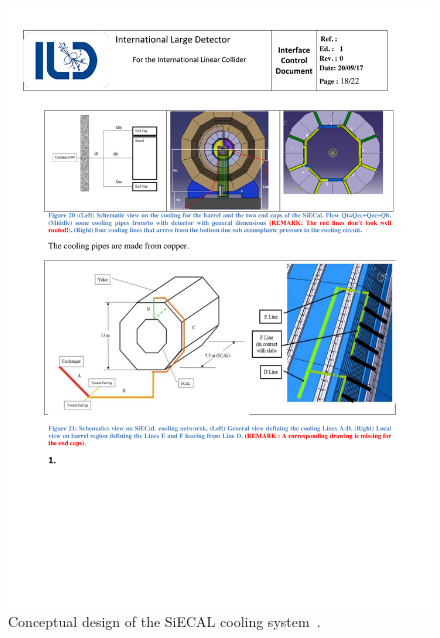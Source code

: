 \begin{figure}[h!]
    \centering
        \includegraphics[width=0.8\hsize]{Integration/fig/SiECAL_Cooling.pdf}
    \caption{Conceptual design of the SiECAL cooling system~\cite{ild:bib:SiECAL_ICD}.}
    \label{ILD:fig:siecal_cooling}
\end{figure}

